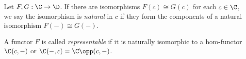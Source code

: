 \begin{terminology}\label{A.1.15}
    Let $F,G : \C\to\D$. If there are isomorphisms $F(c)\cong G(c)$ for each $c\in\C$, we say the isomorphism is \emph{natural} in $c$ if they form the components of a natural isomorphism $F(-)\cong G(-)$.
\end{terminology}

\begin{terminology}\label{A.1.16}
    A functor $F$ is called \emph{representable} if it is naturally isomorphic to a hom-functor $\C(c,-)$ or $\C(-,c)=\C\opp(c,-)$.
\end{terminology}